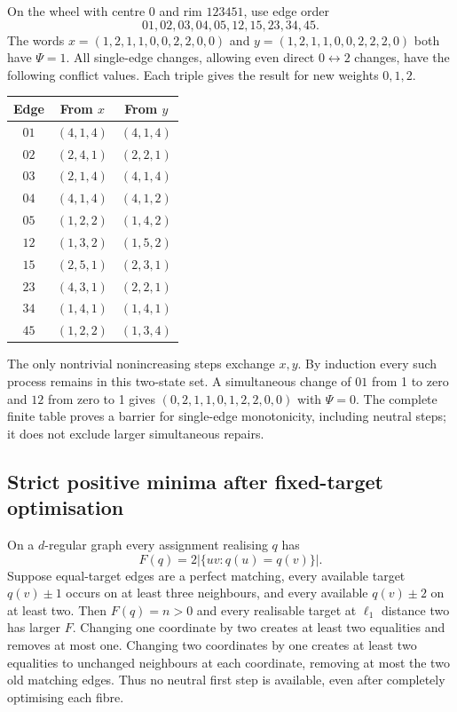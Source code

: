 On the wheel with centre 0 and rim $123451$, use edge order
\[
 01,02,03,04,05,12,15,23,34,45.
\]
The words
$x=(1,2,1,1,0,0,2,2,0,0)$ and
$y=(1,2,1,1,0,0,2,2,2,0)$ both have $\Psi=1$.
All single-edge changes, allowing even direct $0\leftrightarrow2$
changes, have the following conflict values. Each triple gives the
result for new weights $0,1,2$.
\begin{center}\small
\begin{tabular}{ccc}\toprule Edge&From $x$&From $y$\\\midrule
$01$&$(4,1,4)$&$(4,1,4)$\\
$02$&$(2,4,1)$&$(2,2,1)$\\
$03$&$(2,1,4)$&$(4,1,4)$\\
$04$&$(4,1,4)$&$(4,1,2)$\\
$05$&$(1,2,2)$&$(1,4,2)$\\
$12$&$(1,3,2)$&$(1,5,2)$\\
$15$&$(2,5,1)$&$(2,3,1)$\\
$23$&$(4,3,1)$&$(2,2,1)$\\
$34$&$(1,4,1)$&$(1,4,1)$\\
$45$&$(1,2,2)$&$(1,3,4)$\\\bottomrule
\end{tabular}
\end{center}
The only nontrivial nonincreasing steps exchange $x,y$. By induction
every such process remains in this two-state set. A simultaneous
change of $01$ from 1 to zero and $12$ from zero to 1 gives
$(0,2,1,1,0,1,2,2,0,0)$ with $\Psi=0$. The complete finite table
proves a barrier for single-edge monotonicity, including neutral
steps; it does not exclude larger simultaneous repairs.

\subsection{Strict positive minima after fixed-target optimisation}

On a $d$-regular graph every assignment realising $q$ has
\[
 F(q)=2|\{uv:q(u)=q(v)\}|.
\]
Suppose equal-target edges are a perfect matching, every available
target $q(v)\pm1$ occurs on at least three neighbours, and every
available $q(v)\pm2$ on at least two. Then $F(q)=n>0$ and
every realisable target at $\ell_1$ distance two has larger $F$.
Changing one coordinate by two creates at least two equalities and
removes at most one. Changing two coordinates by one creates at
least two equalities to unchanged neighbours at each coordinate,
removing at most the two old matching edges. Thus no neutral first
step is available, even after completely optimising each fibre.


